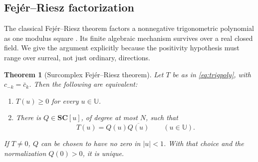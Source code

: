 \documentclass[11pt,letterpaper]{article}
\newtheorem{theorem}{Theorem}[section]
\theoremstyle{definition}
\theoremstyle{remark}
\newcommand{\SC}{\mathbf{SC}}
\newcommand{\U}{\mathbb U}\newcommand{\PP}{\mathbb P}
\numberwithin{equation}{section}
\begin{document}
\subsection{Fej\'er--Riesz factorization}
The classical Fej\'er--Riesz theorem factors a nonnegative trigonometric polynomial as one modulus square \cite{DR}. Its finite algebraic mechanism survives over a real closed field. We give the argument explicitly because the positivity hypothesis must range over surreal, not just ordinary, directions.

\begin{theorem}[Surcomplex Fej\'er--Riesz theorem]\label{thm:fejer}
Let $T$ be as in \eqref{eq:trigpoly}, with $c_{-k}=\bar c_k$. Then the following are equivalent:
\begin{enumerate}
\item $T(u)\ge0$ for every $u\in\U$.
\item There is $Q\in\SC[u]$, of degree at most $N$, such that
\begin{equation}\label{eq:factorization}
 T(u)=Q(u)\overline{Q(u)}\qquad(u\in\U).
\end{equation}
\end{enumerate}
If $T\ne0$, $Q$ can be chosen to have no zero in $|u|<1$. With that choice and the normalization $Q(0)>0$, it is unique.
\end{theorem}
\end{document}

